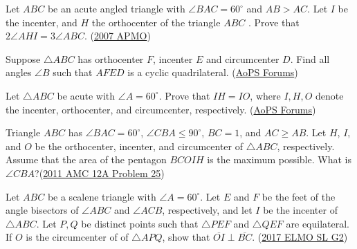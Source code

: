 \documentclass[11pt]{scrartcl}
\begin{document}
\begin{enumerate}
    
    
	\ii Let $ABC$ be an acute angled triangle with $\angle{BAC}=60^\circ$ and $AB > AC$. Let $I$ be the incenter, and $H$ the orthocenter of the triangle $ABC$ . Prove that $2\angle{AHI}= 3\angle{ABC}$. (\href{https://artofproblemsolving.com/community/c6h141391p799589}{2007 APMO})
    
    
	\ii Suppose $\triangle ABC$ has orthocenter $F$, incenter $E$ and circumcenter $D$. Find all angles $\angle B$ such that $AFED$ is a cyclic quadrilateral. (\href{hhttps://artofproblemsolving.com/community/c4h2537747p21610688}{AoPS Forums})


	\ii Let $\triangle ABC$ be acute with $\angle A = 60^\circ$. Prove that $IH = IO$, where $I, H, O$ denote the incenter, orthocenter, and circumcenter, respectively. (\href{https://artofproblemsolving.com/community/c6h1408296}{AoPS Forums})


	\ii Triangle $ABC$ has $\angle BAC=60^\circ$, $\angle CBA \le 90^\circ$, $BC=1$, and $AC \ge AB$. Let $H$, $I$, and $O$ be the orthocenter, incenter, and circumcenter of $\triangle ABC$, respectively. Assume that the area of the pentagon $BCOIH$ is the maximum possible. What is $\angle CBA$?(\href{https://artofproblemsolving.com/community/c5h390791}{2011 AMC 12A Problem 25})

	\ii Let $ABC$ be a scalene triangle with $\angle A = 60^{\circ}$. Let $E$ and $F$ be the feet of the angle bisectors of $\angle ABC$ and $\angle ACB$, respectively, and let $I$ be the incenter of $\triangle ABC$. Let $P,Q$ be distinct points such that $\triangle PEF$ and $\triangle QEF$ are equilateral. If $O$ is the circumcenter of of $\triangle APQ$, show that $\overline{OI}\perp \overline{BC}$. (\href{https://artofproblemsolving.com/community/c6h1472056}{2017 ELMO SL G2})
    
\end{enumerate}
\end{document}
